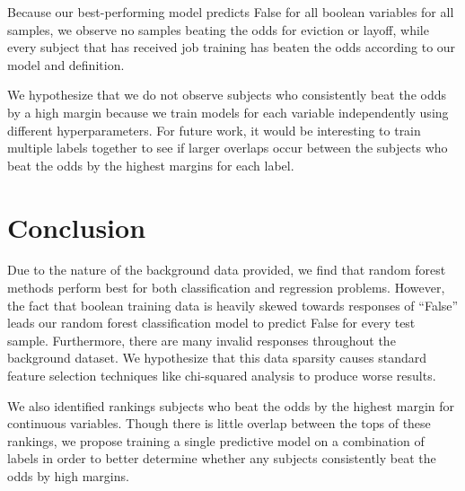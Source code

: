 \documentclass{article} %
\begin{document}
Because our best-performing model predicts False for all boolean variables for all samples, we observe no samples beating the odds for eviction or layoff, while every subject that has received job training has beaten the odds according to our model and definition.

We hypothesize that we do not observe subjects who consistently beat the odds by a high margin because we train models for each variable independently using different hyperparameters. For future work, it would be interesting to train multiple labels together to see if larger overlaps occur between the subjects who beat the odds by the highest margins for each label.

\section{Conclusion}
\label{sec:conclusion}

Due to the nature of the background data provided, we find that random forest methods perform best for both classification and regression problems. However, the fact that boolean training data is heavily skewed towards responses of ``False'' leads our random forest classification model to predict False for every test sample. Furthermore, there are many invalid responses throughout the background dataset. We hypothesize that this data sparsity causes standard feature selection techniques like chi-squared analysis to produce worse results.

We also identified rankings subjects who beat the odds by the highest margin for continuous variables. Though there is little overlap between the tops of these rankings, we propose training a single predictive model on a combination of labels in order to better determine whether any subjects consistently beat the odds by high margins.
\end{document}
